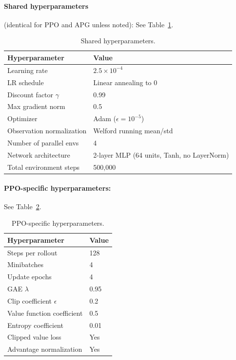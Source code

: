 \documentclass[11pt,a4paper]{article}
\begin{document}
\paragraph{Shared hyperparameters} (identical for PPO and APG unless noted): See Table~\ref{tab:shared_hp}.

\begin{table}[htbp]
  \centering
  \caption{Shared hyperparameters.}
  \label{tab:shared_hp}
  \begin{tabular}{@{}ll@{}}
    \toprule
    \textbf{Hyperparameter} & \textbf{Value} \\
    \midrule
    Learning rate                   & $2.5 \times 10^{-4}$ \\
    LR schedule                     & Linear annealing to 0 \\
    Discount factor $\gamma$        & 0.99 \\
    Max gradient norm               & 0.5 \\
    Optimizer                       & Adam ($\epsilon = 10^{-5}$) \\
    Observation normalization       & Welford running mean/std \\
    Number of parallel envs         & 4 \\
    Network architecture            & 2-layer MLP (64 units, Tanh, no LayerNorm) \\
    Total environment steps         & 500{,}000 \\
    \bottomrule
  \end{tabular}
\end{table}

\paragraph{PPO-specific hyperparameters:} See Table~\ref{tab:ppo_hp}.

\begin{table}[htbp]
  \centering
  \caption{PPO-specific hyperparameters.}
  \label{tab:ppo_hp}
  \begin{tabular}{@{}ll@{}}
    \toprule
    \textbf{Hyperparameter} & \textbf{Value} \\
    \midrule
    Steps per rollout           & 128 \\
    Minibatches                 & 4 \\
    Update epochs               & 4 \\
    GAE $\lambda$               & 0.95 \\
    Clip coefficient $\epsilon$ & 0.2 \\
    Value function coefficient  & 0.5 \\
    Entropy coefficient         & 0.01 \\
    Clipped value loss          & Yes \\
    Advantage normalization     & Yes \\
    \bottomrule
  \end{tabular}
\end{table}
\end{document}
